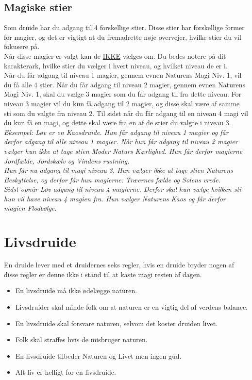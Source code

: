 \section{Magiske stier}
Som druide har du adgang til 4 forskellige stier. Disse stier har forskellige former for magier, og det er vigtigt at du fremadrette nøje overvejer, hvilke stier du vil fokusere på.\\
Når disse magier er valgt kan de \underline{IKKE} vælges om. Du bedes notere på dit karakterark, hvilke stier du vælger i hvert niveau, og hvilket niveau de er i.\\
Når du får adgang til niveau 1 magier, gennem evnen Naturens Magi Niv. 1, vil du få alle 4 stier. Når du får adgang til niveau 2 magier, gennem evnen Naturens Magi Niv. 1, skal du vælge 3 magier som du får adgang til fra dette niveau. For niveau 3 magier vil du kun få adgang til 2 magier, og disse skal være af samme sti som du valgte fra niveau 2. Til sidst når du får adgang til en niveau 4 magi vil du kun få en magi, og dette skal være fra en af de stier du valgte i niveau 3. \\
\textit{Eksempel: Løv er en Kaosdruide. Hun får adgang til niveau 1 magier og får derfor adgang til alle niveau 1 magier. Når hun får adgang til niveau 2 magier vælger hun ikke at tage stien Moder Naturs Kærlighed. Hun får derfor magierne Jordfælde, Jordskælv og Vindens rustning.\\
Hun får nu adgang til magi niveau 3. Hun vælger ikke at tage stien Naturens Beskyttelse, og derfor får hun magierne: Træernes fælde og Solens vrede.\\
Sidst opnår Løv adgang til niveau 4 magierne. Derfor skal hun vælge hvilken sti hun vil have niveau 4 magien fra. Hun vælger Naturens Kaos og får derfor magien Flodbølge.\\}

\chapter{Livsdruide}

En druide lever med et druidernes seks regler, hvis en druide bryder nogen af disse regler er denne ikke i stand til at kaste magi resten af dagen.
\begin{itemize}
    \item En livsdruide må ikke ødelægge naturen.
    \item Livsdruider skal minde folk om at naturen er en vigtig del af verdens balance.
    \item En livsdruide skal forsvare naturen, selvom det koster druiden livet.
    \item Folk skal straffes hvis de misbruger naturen.
    \item En livsdruide tilbeder Naturen og Livet men ingen gud.
    \item Alt liv er helligt for en livsdruide.
\end{itemize}



